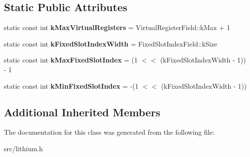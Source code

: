 \subsection*{Static Public Attributes}
\begin{DoxyCompactItemize}
\item 
\hypertarget{classv8_1_1internal_1_1_l_unallocated_a74a05ec5d4c76ae15d49d160d4d4009b}{}static const int {\bfseries k\+Max\+Virtual\+Registers} = Virtual\+Register\+Field\+::k\+Max + 1\label{classv8_1_1internal_1_1_l_unallocated_a74a05ec5d4c76ae15d49d160d4d4009b}

\item 
\hypertarget{classv8_1_1internal_1_1_l_unallocated_aa4a4b055aaeec6f7a10122a6cddf53a9}{}static const int {\bfseries k\+Fixed\+Slot\+Index\+Width} = Fixed\+Slot\+Index\+Field\+::k\+Size\label{classv8_1_1internal_1_1_l_unallocated_aa4a4b055aaeec6f7a10122a6cddf53a9}

\item 
\hypertarget{classv8_1_1internal_1_1_l_unallocated_ad715869b332be98feff8e3a82ffa81bc}{}static const int {\bfseries k\+Max\+Fixed\+Slot\+Index} = (1 $<$$<$ (k\+Fixed\+Slot\+Index\+Width -\/ 1)) -\/ 1\label{classv8_1_1internal_1_1_l_unallocated_ad715869b332be98feff8e3a82ffa81bc}

\item 
\hypertarget{classv8_1_1internal_1_1_l_unallocated_a1b02a7bd7de114b94d3b59d331547645}{}static const int {\bfseries k\+Min\+Fixed\+Slot\+Index} = -\/(1 $<$$<$ (k\+Fixed\+Slot\+Index\+Width -\/ 1))\label{classv8_1_1internal_1_1_l_unallocated_a1b02a7bd7de114b94d3b59d331547645}

\end{DoxyCompactItemize}
\subsection*{Additional Inherited Members}


The documentation for this class was generated from the following file\+:\begin{DoxyCompactItemize}
\item 
src/lithium.\+h\end{DoxyCompactItemize}
